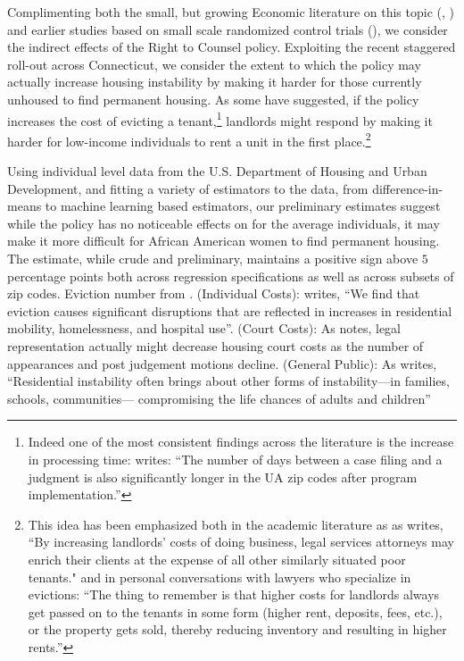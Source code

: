 \documentclass[a4paper,12pt]{article}
\begin{document}
 Complimenting both the small, but growing Economic literature on this topic (\cite{abramson2021welfare}, \cite{cassidy2022effects}) and earlier studies based on small scale randomized control trials (\cite{seron2001impact}), we consider the indirect effects of the Right to Counsel policy. Exploiting the recent staggered roll-out across Connecticut, we consider the extent to which the policy may actually increase housing instability by making it harder for those currently unhoused to find permanent housing. As some have suggested, if the policy increases the cost of evicting a tenant,\footnote{Indeed one of the most consistent findings across the literature is the increase in processing time: \cite{cassidy2022effects} writes: ``The number of days between a case filing and a judgment is also significantly longer in the UA zip codes after program implementation.''} landlords might respond by making it harder for low-income individuals to rent a unit in the first place.\footnote{This idea has been emphasized both in the academic literature as as \cite{gunn1995eviction} writes, ``By increasing landlords' costs of doing business, legal services attorneys may enrich their clients at the expense of all other similarly situated poor tenants."  and in personal conversations with lawyers who specialize in evictions: ``The thing to remember is that higher costs for landlords always get passed on to the tenants in some form (higher rent, deposits, fees, etc.), or the property gets sold, thereby reducing inventory and resulting in higher rents.''}

Using individual level data from the U.S. Department of Housing and Urban Development, and fitting a variety of estimators to the data, from difference-in-means to machine learning based estimators, our preliminary estimates suggest while the policy has no noticeable effects on for the average individuals, it may make it more difficult for African American women to find permanent housing. The estimate, while crude and preliminary, maintains a positive sign above $5$ percentage points both across regression specifications as well as across subsets of zip codes. 
Eviction number from \cite{gromis2022estimating}. (Individual Costs): \cite{collinson2022eviction} writes, ``We find that eviction causes significant disruptions that are reflected in increases in residential mobility, homelessness, and hospital use''. (Court Costs): As \cite{seron2001impact} notes, legal representation actually might decrease housing court costs as the number of appearances and post judgement motions decline. (General Public): As \cite{desmond2019unaffordable} writes, ``Residential instability often brings about other forms of instability—in families, schools, communities— compromising the life chances of adults and children''
\end{document}
